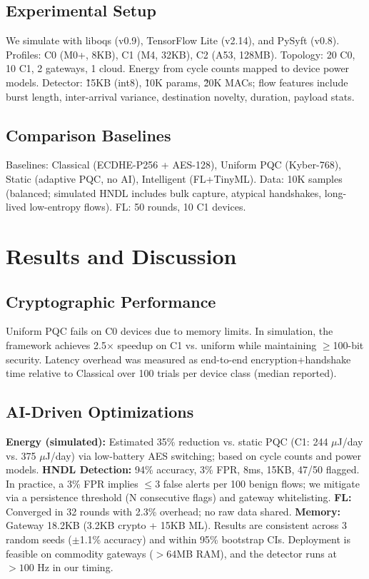 \documentclass[conference]{IEEEtran}
\begin{document}
\subsection{Experimental Setup}
We simulate with liboqs (v0.9), TensorFlow Lite (v2.14), and PySyft (v0.8). Profiles: C0 (M0+, 8KB), C1 (M4, 32KB), C2 (A53, 128MB). Topology: 20 C0, 10 C1, 2 gateways, 1 cloud. Energy from cycle counts mapped to device power models. Detector: \~15KB (int8), \~10K params, \~20K MACs; flow features include burst length, inter-arrival variance, destination novelty, duration, payload stats.

\subsection{Comparison Baselines}
Baselines: Classical (ECDHE-P256 + AES-128), Uniform PQC (Kyber-768), Static (adaptive PQC, no AI), Intelligent (FL+TinyML). Data: 10K samples (balanced; simulated HNDL includes bulk capture, atypical handshakes, long-lived low-entropy flows). FL: 50 rounds, 10 C1 devices.

\section{Results and Discussion}

\subsection{Cryptographic Performance}
Uniform PQC fails on C0 devices due to memory limits. In simulation, the framework achieves 2.5$\times$ speedup on C1 vs. uniform while maintaining $\geq$100-bit security. Latency overhead was measured as end-to-end encryption+handshake time relative to Classical over 100 trials per device class (median reported).

\subsection{AI-Driven Optimizations}
\textbf{Energy (simulated):} Estimated 35\% reduction vs. static PQC (C1: 244 $\mu$J/day vs. 375 $\mu$J/day) via low-battery AES switching; based on cycle counts and power models. \textbf{HNDL Detection:} 94\% accuracy, 3\% FPR, 8ms, 15KB, 47/50 flagged. In practice, a 3\% FPR implies $\leq$3 false alerts per 100 benign flows; we mitigate via a persistence threshold (N consecutive flags) and gateway whitelisting. \textbf{FL:} Converged in 32 rounds with 2.3\% overhead; no raw data shared. \textbf{Memory:} Gateway 18.2KB (3.2KB crypto + 15KB ML). Results are consistent across 3 random seeds (\(\pm\)1.1\% accuracy) and within 95\% bootstrap CIs. Deployment is feasible on commodity gateways (\(>\)64MB RAM), and the detector runs at \(>100\) Hz in our timing.
\end{document}

